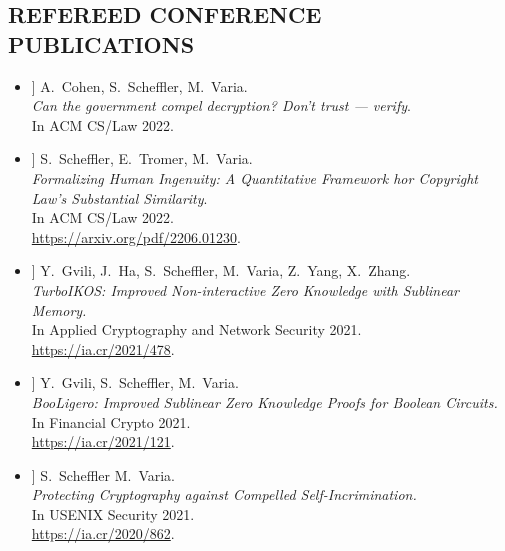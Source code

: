 \documentclass{res}
\begin{document}
\begin{resume}
\section{REFEREED CONFERENCE PUBLICATIONS}
\vspace{0.25in}

\newcommand{\foregoneVerif}{[1]\xspace}
\newcommand{\copyrightMDL}{[2]\xspace}
\newcommand{\turboikos}{[3]\xspace}
\newcommand{\booligero}{[4]\xspace}
\newcommand{\foregoneconclusion}{[5]\xspace}
\newcommand{\AEC}{[6]\xspace}
\newcommand{\devicefingerprinting}{[7]\xspace}
\newcommand{\pullingblocks}{[8]\xspace}
\newcommand{\fairsibility}{[9]\xspace}
\newcommand{\emailspam}{[10]\xspace}

\begin{itemize}
\item[\foregoneVerif] A.~Cohen, S.~Scheffler, M.~Varia. \\
\emph{Can the government compel decryption?  Don't trust --- verify}. \\
In ACM CS/Law 2022.

\item[\copyrightMDL] S.~Scheffler, E.~Tromer, M.~Varia. \\
\emph{Formalizing Human Ingenuity: A Quantitative Framework hor Copyright Law's Substantial Similarity}. \\
In ACM CS/Law 2022. \\
\url{https://arxiv.org/pdf/2206.01230}.

\item[\turboikos] Y.~Gvili, J.~Ha, S.~Scheffler, M.~Varia, Z.~Yang, X.~Zhang. \\
\emph{TurboIKOS: Improved Non-interactive Zero Knowledge with Sublinear Memory.} \\
In Applied Cryptography and Network Security 2021. \\
\url{https://ia.cr/2021/478}.

\item[\booligero] Y.~Gvili, S.~Scheffler, M.~Varia. \\
\emph{BooLigero: Improved Sublinear Zero Knowledge Proofs for Boolean Circuits.} \\
In Financial Crypto 2021. \\
\url{https://ia.cr/2021/121}.

\item[\foregoneconclusion] S.~Scheffler M.~Varia. \\
\emph{Protecting Cryptography against Compelled Self-Incrimination.} \\
In USENIX Security 2021. \\
\url{https://ia.cr/2020/862}.


\end{itemize}
\end{resume}
\end{document}
